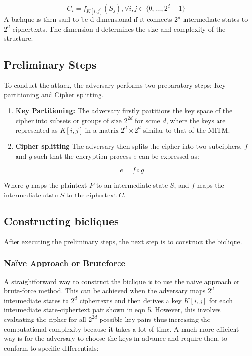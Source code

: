 \documentclass{rapport}
\begin{document}
\begin{equation}
C_i = f_{K[i, j]}(S_j), \forall i, j \in \{0, \ldots, 2^d - 1\}
\end{equation}
A biclique is then said to be d-dimensional if it connects $2^d$ intermediate states to $2^d$ ciphertexts. The dimension d determines the size and complexity of the structure. 

\subsection{Preliminary Steps}
To conduct the attack, the adversary performs two preparatory steps; Key partitioning and Cipher splitting.

\begin{enumerate}
    \item \textbf{Key Partitioning:}
    The adversary firstly partitions the key space of the cipher into subsets or groups of size $2^{2d}$ for some $d$, where the keys are represented as $K[i, j]$ in a matrix $2^d \times 2^d$ similar to that of the MITM.

    \item \textbf{Cipher splitting}
    The adversary then splits the cipher into two subciphers, $f$ and $g$ such that the encryption process $e$ can be expressed as:
    
    \begin{equation}
        e = f \circ g
    \end{equation}
    
\end{enumerate}
Where $g$ maps the plaintext $P$ to an intermediate state $S$, and $f$ maps the intermediate state $S$ to the ciphertext $C$.


\subsection{Constructing bicliques}
After executing the preliminary steps, the next step is to construct the biclique.

\subsubsection{Naïve Approach or Bruteforce}
A straightforward way to construct the biclique is to use the naive approach or brute-force method. This can be achieved when the adversary maps $2^d$ intermediate states to $2^d$ ciphertexts and then derives a key $K[i, j]$ for each intermediate state-ciphertext pair shown in eqn 5. However, this involves evaluating the cipher for all $2^{2d}$ possible key pairs thus increasing the computational complexity because it takes a lot of time. A much more efficient way is for the adversary to choose the keys in advance and require them to conform to specific differentials:
\end{document}
